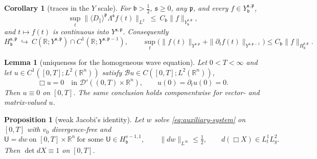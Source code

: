 \documentclass[10pt,a4paper]{amsart}
\newtheorem{lemma}{Lemma}
\newtheorem{corollary}{Corollary}
\newtheorem{proposition}{Proposition}
\newcommand{\Real}{\mathbb R}
\newcommand{\Rn}{\Real^n}
\newcommand{\Ufield}{\mathsf U}
\newcommand{\breg}{\mathfrak b}
\newcommand{\preg}{\mathfrak p}
\newcommand{\sreg}{\mathfrak s}
\begin{document}
\begin{corollary}[traces in the $Y$ scale]\label{cor:trace-Y}
For $\breg>\frac12$, $\sreg\ge0$, any $\preg$, and every
$f\in Y^{\sreg,\preg}_{\breg}$,
$$\sup_t\big\|\langle D_{\parallel}\rangle^{\preg}\Lambda^{\sreg}f(t)\big\|_{L^{2}}\ \le\
C_{\breg} \|f\|_{Y^{\sreg,\preg}_{\breg}},$$
and $t\mapsto f(t)$ is continuous into $Y^{\sreg,\preg}$. Consequently
\begin{equation}\label{eq:trace-class}
H^{\sreg,\preg}_{\breg}\ \hookrightarrow\ C(\Real;Y^{\sreg,\preg})\cap C^1(\Real;Y^{\sreg,\preg-1}),
\qquad
\sup_t\big(\|f(t)\|_{Y^{\sreg,\preg}}+\|\partial_tf(t)\|_{Y^{\sreg,\preg-1}}\big)
\le C_{\breg}\|f\|_{H^{\sreg,\preg}_{\breg}}.
\end{equation}
\end{corollary}

\begin{lemma}[uniqueness for the homogeneous wave equation]\label{lem:wave-uniqueness}
Let $0<T<\infty$ and let $u\in C^1([0,T];L^2(\Rn))$ satisfy
$\mathcal Bu\in C([0,T];L^2(\Rn))$,
\[
 \Box u=0\quad\text{in }\mathcal D'((0,T)\times\Rn),
 \qquad
 u(0)=\partial_tu(0)=0 .
\]
Then $u\equiv0$ on $[0,T]$. The same conclusion holds componentwise for
vector- and matrix-valued $u$.
\end{lemma}

\begin{proposition}[weak Jacobi's identity]\label{prop:constraint}
Let $w$ solve \eqref{eq:auxiliary-system} on $[0,T]$ with $v_0$ divergence-free and
\begin{equation}\label{eq:constraint-hyp}
\Ufield=dw\ \text{on }[0,T]\times\Rn
\ \text{for some }\Ufield\in H^{s-1,1}_{\breg},
\qquad \big\|dw\big\|_{L^\infty}\le\tfrac12,\qquad
d(\Box X)\in L^1_tL^2_{y} .
\end{equation}
Then $\det dX\equiv1$ on $[0,T]$.
\end{proposition}
\end{document}

